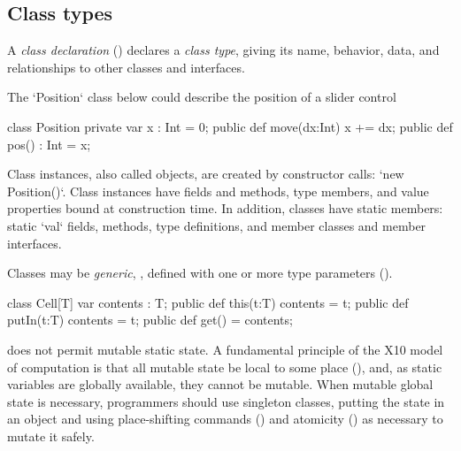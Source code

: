 \subsection{Class types}


A {\em class declaration} () declares a {\em class type},
giving its name, behavior, data, and relationships to other classes and
interfaces. 

\begin{ex}

The \xcd`Position` class below could describe the position of a slider
control

\begin{xten}
class Position {
  private var x : Int = 0;
  public def move(dx:Int) { x += dx; }
  public def pos() : Int = x;
}
\end{xten}
%
\end{ex}
Class instances, also called objects, are created by constructor calls: 
\xcd`new Position()`. Class
instances have fields and methods, type members, and value properties bound at
construction time. In addition, classes have static members: static \xcd`val` fields,
methods, type definitions, and member classes and member interfaces.

Classes may be {\em generic}, \ie, defined with one or more type
parameters ().  

\begin{xten}
class Cell[T] {
  var contents : T;
  public def this(t:T) { contents = t;  }
  public def putIn(t:T) { contents = t; }
  public def get() = contents;
  }
\end{xten}


\Xten{} does not permit mutable static state. A fundamental principle of the
X10 model of computation is that all mutable state be local to some place
(), and, as static variables are
globally available, they
cannot be mutable. When mutable global state is necessary, programmers should
use singleton classes, putting the state in an object and using place-shifting
commands () and atomicity () as necessary
to mutate it safely.

